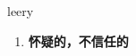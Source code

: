 
\begin{frame}
{\huge leery}
\begin{center}
\begin{enumerate}\Large
  \item \textbf{怀疑的，不信任的}
\end{enumerate}
\end{center}
\end{frame}
